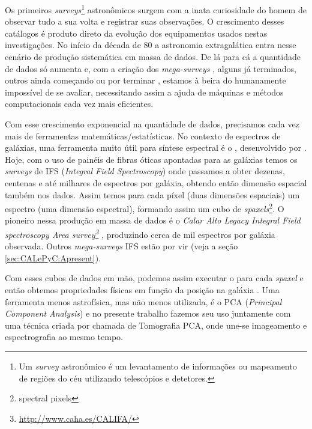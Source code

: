 Os primeiros {\em surveys}\footnote{Um {\em survey} astronômico é um
levantamento de informações ou mapeamento de regiões do céu utilizando
telescópios e detetores.} astronômicos surgem com a inata curiosidade do homem
de observar tudo a sua volta e registrar suas observações. O crescimento desses
catálogos é produto direto da evolução dos equipamentos usados nestas
investigações. No início da década de 80 \citep{Huchra1983, Huchra1988,
DaCosta1988} a astronomia extragalática entra nesse cenário de produção
sistemática em massa de dados. De lá para cá a quantidade de dados só aumenta e,
com a criação dos {\em mega-surveys} \citep[\SDSS; ][]{York2000}
\citep[2dFGRS;][]{Colless1999} \citep[2MASS;][]{Skrutskie2006}, alguns já
terminados, outros ainda começando ou por terminar \citep[LSST; ][]{Ivezic2008}
\citep[J-PAS;][]{Benitez2009}, estamos à beira do humanamente impossível de se
avaliar, necessitando assim a ajuda de máquinas e métodos computacionais cada
vez mais eficientes.

Com esse crescimento exponencial na quantidade de dados, precisamos cada vez
mais de ferramentas matemáticas/estatísticas. No contexto de espectros de
galáxias, uma ferramenta muito útil para síntese espectral é o \starlight,
desenvolvido por \citet{CidFernandes2005}. Hoje, com o uso de painéis de fibras
óticas apontadas para as galáxias temos os {\em surveys} de IFS ({\em Integral
Field Spectroscopy}) onde passamos a obter dezenas, centenas e até milhares de
espectros por galáxia, obtendo então dimensão espacial também nos dados. Assim
temos para cada píxel (duas dimensões espaciais) um espectro (uma dimensão
espectral), formando assim um cubo de {\em spaxels}\footnote{spectral pixels}. O
pioneiro nessa produção em massa de dados é o {\em Calar Alto Legacy Integral
Field spectroscopy Area survey\footnote{\url{http://www.caha.es/CALIFA/}}}
\citep[CALIFA; ][]{CALIFAPresent2012}, produzindo cerca de mil espectros por
galáxia observada. Outros {\em mega-surveys} IFS estão por vir (veja a seção
\ref{sec:CALePyC:Apresent}).

Com esses cubos de dados em mão, podemos assim executar o \starlight para
cada {\em spaxel} e então obtemos propriedades físicas em função da posição na
galáxia \citep{CidFernandes2013I}. Uma ferramenta menos astrofísica, mas não
menos utilizada, é o PCA ({\em Principal Component Analysis}) e no presente
trabalho fazemos seu uso juntamente com uma técnica criada por
\citet{Steiner2009} chamada de Tomografia PCA, onde une-se imageamento e
espectrografia ao mesmo tempo.

